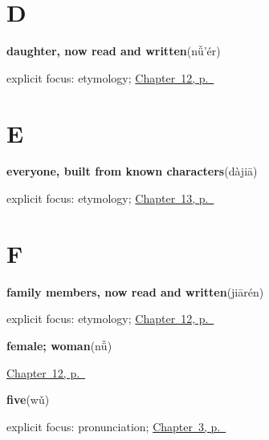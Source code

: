 \section*{D}

\noindent\begin{minipage}[t]{\linewidth}
\raggedright
\textbf{daughter, now read and written}\enspace\emph{}\enspace(nǚ'ér)\par
\footnotesize explicit focus: etymology; \hyperref[ch:zh-family-six]{Chapter~12, p.~\pageref*{ch:zh-family-six}}
\end{minipage}\par\smallskip

\section*{E}

\noindent\begin{minipage}[t]{\linewidth}
\raggedright
\textbf{everyone, built from known characters}\enspace\emph{}\enspace(dàjiā)\par
\footnotesize explicit focus: etymology; \hyperref[ch:zh-school-six]{Chapter~13, p.~\pageref*{ch:zh-school-six}}
\end{minipage}\par\smallskip

\section*{F}

\noindent\begin{minipage}[t]{\linewidth}
\raggedright
\textbf{family members, now read and written}\enspace\emph{}\enspace(jiārén)\par
\footnotesize explicit focus: etymology; \hyperref[ch:zh-family-six]{Chapter~12, p.~\pageref*{ch:zh-family-six}}
\end{minipage}\par\smallskip

\noindent\begin{minipage}[t]{\linewidth}
\raggedright
\textbf{female; woman}\enspace\emph{}\enspace(nǚ)\par
\footnotesize \hyperref[ch:zh-family-six]{Chapter~12, p.~\pageref*{ch:zh-family-six}}
\end{minipage}\par\smallskip

\noindent\begin{minipage}[t]{\linewidth}
\raggedright
\textbf{five}\enspace\emph{}\enspace(wǔ)\par
\footnotesize explicit focus: pronunciation; \hyperref[ch:zh-numbers]{Chapter~3, p.~\pageref*{ch:zh-numbers}}
\end{minipage}\par\smallskip

